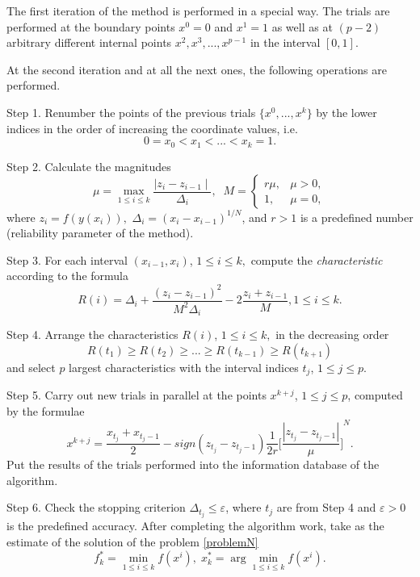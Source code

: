 \documentclass[runningheads]{llncs}
\begin{document}
The first iteration of the method is performed in a special way. The trials are performed at the boundary points $x^0 = 0$ and $x^1 = 1$ as well as at $(p-2)$ arbitrary different internal points $x^2, x^3, ..., x^{p-1}$ in the interval $[0,1]$.

At the second iteration and at all the next ones, the following operations are performed.

Step 1. Renumber the points of the previous trials $\{x^0,...,x^k\}$ by the lower indices in the order of increasing the coordinate values, i.e. 
$$ 0 = x_0 < x_1 < ... < x_k = 1.$$

Step 2. Calculate the magnitudes 
\begin{equation}\label{M}
\mu = \max\limits_{1 \leq i \leq k} \frac{\mid z_i - z_{i-1} \mid}{\Delta_i}, \;\;
M = \left\{ \begin{array}{ll}
                r\mu, & \textrm{$\mu > 0$,}\\
                1, & \textrm{$\mu = 0$},
  \end{array} \right.
\end{equation}
where $z_i = f(y(x_i)),$  $\Delta_i = {(x_i - x_{i-1})}^{1/N}$, and $r > 1$ is a predefined number (reliability parameter of the method).

Step 3. For each interval $(x_{i-1}, x_i)$, $1 \leq i \leq k,$ compute the \textit{characteristic} according to the formula
\begin{equation}\label{R}
R(i) = \Delta_i + \frac{(z_i - z_{i-1})^2}{M^2 \Delta_i} - 2 \frac{z_i + z_{i-1}}{M}, 1 \leq i \leq k. 
\end{equation} 

Step 4. Arrange the characteristics $R(i)$, $1 \leq i \leq k,$ in the decreasing order
\begin{equation} \label{OrderedR}
 R(t_1) \geq R(t_2) \geq ... \geq R(t_{k-1}) \geq R(t_{k+1}) 
\end{equation}
and select $p$ largest characteristics with the interval indices $t_j$, $1 \leq j \leq p$.

Step 5. Carry out new trials in parallel at the points $x^{k+j}$, $1 \leq j \leq p$, computed by the formulae
$$ x^{k+j} = \frac{x_{t_j} + x_{t_j - 1}}{2} - sign(z_{t_j} - z_{t_j - 1}) \frac{1}{2r} {\Bigg[\frac{\left| z_{t_j} - z_{t_j - 1} \right|}{\mu}\Bigg]}^{N}.$$
Put the results of the trials performed into the information database of the algorithm.

Step 6. Check the stopping criterion $\Delta_{t_j} \leq \varepsilon$, where $t_j$ are from Step 4 and $\varepsilon > 0$ is the predefined accuracy. 
After completing the algorithm work, take as the estimate of the solution of the problem \ref{problemN} 
$$ f_k^* = \min\limits_{1 \leq i \leq k} f(x^i), \; x_k^* = \arg \min\limits_{1 \leq i \leq k} f(x^i).$$
\end{document}
